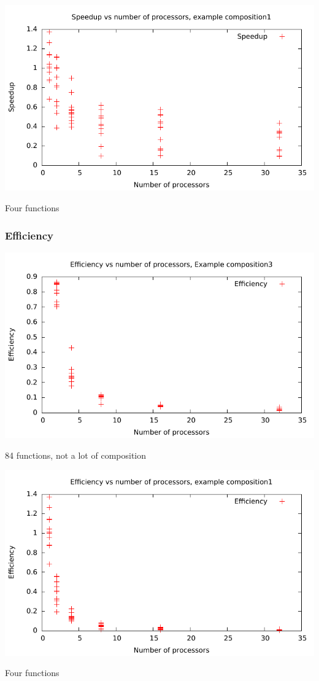 \documentclass{beamer}
\begin{document}
\begin{frame}
\includegraphics[scale=0.8]{../../data/composite1-speedup.pdf}

Four functions
\end{frame}

\begin{frame}
	\frametitle{Efficiency}
\includegraphics[scale=0.8]{../../data/composite3-efficiency.pdf}

84 functions, not a lot of composition
\end{frame}

\begin{frame}
\includegraphics[scale=0.8]{../../data/composite1-efficiency.pdf}

Four functions
\end{frame}
\end{document}
